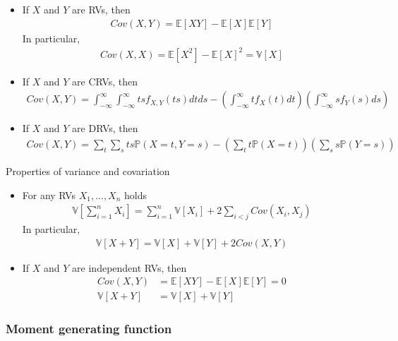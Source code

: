 \documentclass[10pt]{article}
\begin{document}
\begin{itemize}
    \item If $X$ and $Y$ are RVs, then
          \begin{align}
              Cov(X, Y)=\mathbb{E}[XY]-\mathbb{E}[X]\mathbb{E}[Y]
          \end{align}
          In particular,
          \begin{align}
              Cov(X,X)=\mathbb{E}[X^2]-{\mathbb{E}[X]}^2=\mathbb{V}[X]
          \end{align}
    \item If $X$ and $Y$ are CRVs, then
          \begin{align}
              Cov(X,Y)=
              \int_{-\infty}^{\infty}\int_{-\infty}^{\infty}tsf_{X,Y}(ts)dtds
              - \left(\int_{-\infty}^{\infty} tf_X(t)dt\right)
              \left(\int_{-\infty}^{\infty} sf_Y(s)ds\right)
          \end{align}
    \item If $X$ and $Y$ are DRVs, then
          \begin{align}
              Cov(X,Y)=\sum_t\sum_s ts \mathbb{P}(X=t,Y=s)-
              \left(\sum_t t\mathbb{P}(X=t)\right)
              \left(\sum_s s\mathbb{P}(Y=s)\right)
          \end{align}
\end{itemize}

Properties of variance and covariation
\begin{itemize}
    \item For any RVs $X_1,\ldots,X_n$ holds
          \begin{align}
              \mathbb{V}[\sum_{i=1}^n X_i] =
              \sum_{i=1}^n\mathbb{V}[X_i]+2\sum_{i<j}Cov(X_i,X_j)
          \end{align}
          In particular,
          \begin{align}
              \mathbb{V}[X+Y]=\mathbb{V}[X]+\mathbb{V}[Y]+2Cov(X, Y)
          \end{align}
    \item If $X$ and $Y$ are independent RVs, then
          \begin{align}
              Cov(X,Y)        & =\mathbb{E}[XY]-\mathbb{E}[X]\mathbb{E}[Y]=0 \\
              \mathbb{V}[X+Y] & =\mathbb{V}[X]+\mathbb{V}[Y]
          \end{align}
\end{itemize}


\subsubsection{Moment generating function}
\end{document}
